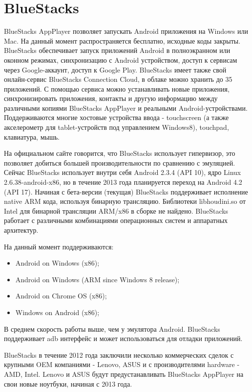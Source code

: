 \section{BlueStacks}

BlueStacks AppPlayer позволяет запускать Android приложения на Windows или Mac. На данный момент распространяется бесплатно, исходные коды закрыты. BlueStacks обеспечивает запуск приложений Android в полноэкранном или оконном режимах, синхронизацию с Android устройством, доступ к сервисам через Google-аккаунт, доступ к Google Play. BlueStacks имеет также свой онлайн-сервис BlueStacks Connection Cloud, в облаке можно хранить до 35 приложений. С помощью сервиса можно устанавливать новые приложения, синхронизировать приложения, контакты и другую информацию между различными копиями BlueStacks AppPlayer и реальными Android-устройствами. Поддерживаются многие хостовые устройства ввода - touchscreen (а также акселерометр для tablet-устройств под управлением Windows8), touchpad, клавиатура, мышь.

На официальном сайте говорится, что BlueStacks использует гипервизор, это позволяет добиться большей производительности по сравнению с эмуляцией. Сейчас BlueStacks использует внутри себя Android 2.3.4 (API 10), ядро Linux 2.6.38-android-x86, но в течение 2013 года планируется переход на Android 4.2 (API 17). Начиная с бета-версии (текущая) BlueStacks поддерживает исполнение native ARM кода, используя бинарную трансляцию. Библиотеки libhoudini.so от Intel для бинарной трансляции ARM/x86 в сборке не найдено. BlueStacks работает с различными комбинациями операционных систем и аппаратных архитектур.

На данный момент поддерживаются:
\begin{itemize}
    \item Android on Windows (x86);
    \item Android on Windows (ARM since Windows 8 release);
    \item Android on Chrome OS (x86);
    \item Windows on Android (x86);
\end{itemize}

В среднем скорость работы выше, чем у эмулятора Android. BlueStacks поддерживает adb интерфейс и может использоваться для отладки приложений.

BlueStacks в течение 2012 года заключили несколько коммерческих сделок с крупными OEM компаниями - Lenovo, ASUS и с производителями hardware - AMD, Intel. Lenovo и ASUS будут предустанавливать BlueStacks AppPlayer на свои новые ноутбуки, начиная с 2013 года.

